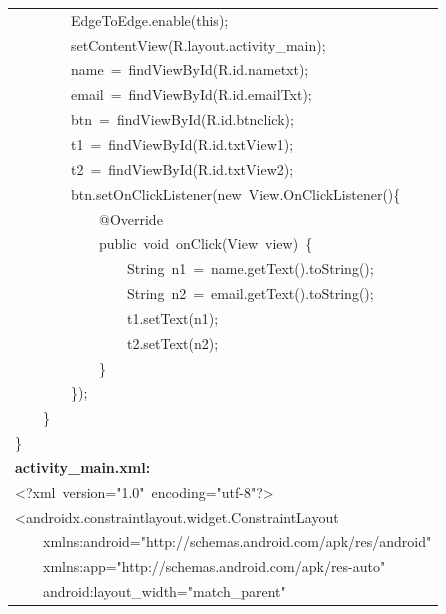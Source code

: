 \documentclass[a4paper,12pt]{article}
\begin{document}
\begin{longtable}{|p{}|}
{\ttfamily\small \ \ \ \ \ \ \ \ EdgeToEdge.enable(this);} \\
{\ttfamily\small \ \ \ \ \ \ \ \ setContentView(R.layout.activity\_main);} \\
{\ttfamily\small \ \ \ \ \ \ \ \ name\ =\ findViewById(R.id.nametxt);} \\
{\ttfamily\small \ \ \ \ \ \ \ \ email\ =\ findViewById(R.id.emailTxt);} \\
{\ttfamily\small \ \ \ \ \ \ \ \ btn\ =\ findViewById(R.id.btnclick);} \\
{\ttfamily\small \ \ \ \ \ \ \ \ t1\ =\ findViewById(R.id.txtView1);} \\
{\ttfamily\small \ \ \ \ \ \ \ \ t2\ =\ findViewById(R.id.txtView2);} \\
{\ttfamily\small \ \ \ \ \ \ \ \ btn.setOnClickListener(new\ View.OnClickListener()\{} \\
{\ttfamily\small \ \ \ \ \ \ \ \ \ \ \ \ @Override} \\
{\ttfamily\small \ \ \ \ \ \ \ \ \ \ \ \ public\ void\ onClick(View\ view)\ \{} \\
{\ttfamily\small \ \ \ \ \ \ \ \ \ \ \ \ \ \ \ \ String\ n1\ =\ name.getText().toString();} \\
{\ttfamily\small \ \ \ \ \ \ \ \ \ \ \ \ \ \ \ \ String\ n2\ =\ email.getText().toString();} \\
{\ttfamily\small \ \ \ \ \ \ \ \ \ \ \ \ \ \ \ \ t1.setText(n1);} \\
{\ttfamily\small \ \ \ \ \ \ \ \ \ \ \ \ \ \ \ \ t2.setText(n2);} \\
{\ttfamily\small \ \ \ \ \ \ \ \ \ \ \ \ \}} \\
{\ttfamily\small \ \ \ \ \ \ \ \ \});} \\
{\ttfamily\small \ \ \ \ \}} \\
{\ttfamily\small \}} \\
\hline
\rule{0pt}{13pt}\textbf{activity\_main.xml:} \\
\hline
{\ttfamily\small \textless{}?xml\ version="1.0"\ encoding="utf-8"?\textgreater{}} \\
{\ttfamily\small \textless{}androidx.constraintlayout.widget.ConstraintLayout} \\
{\ttfamily\small \ \ \ \ xmlns:android="http://schemas.android.com/apk/res/android"} \\
{\ttfamily\small \ \ \ \ xmlns:app="http://schemas.android.com/apk/res-auto"} \\
{\ttfamily\small \ \ \ \ android:layout\_width="match\_parent"} \\

\end{longtable}
\end{document}
